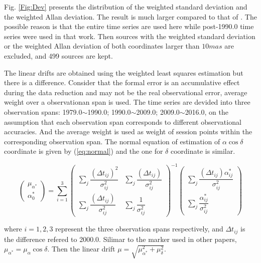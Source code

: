 \documentclass{aa}
\begin{document}
Fig. \ref{Fig:Dev} presents the distribution of the weighted standard deviation and the weighted Allan deviation. The result is much larger compared to that of \cite{F-V2003}. The possible reason is that the entire time series are used here while post-1990.0 time series were used in that work. Then sources with the weighted standard deviation or the weighted Allan deviation of both coordinates larger than $10mas$ are excluded, and 499 sources are kept.

The linear drifts are obtained using the weighted least squares estimation but there is a difference. Consider that the formal error is an accumulative effect during the data reduction and may not be the real observational error, average weight over a observationan span is used. The time series are devided into three observation spans: 1979.0$\sim$1990.0; 1990.0$\sim$2009.0; 2009.0$\sim$2016.0, on the assumption that each observation span corresponds to different observational accuracies. And the average weight is used as weight of session points within the corresponding observation span. The normal equation of estimation of $\alpha\cos\delta$ coordinate is  given by (\ref{eq:normal}) and the one for $\delta$ coordinate is similar. 

\begin{equation}
\label{eq:normal}
\left(
	\begin{array}{c}
	\mu _{\alpha ^{*}} \\
	\alpha ^{*}_0
	\end{array}
\right)
	= \sum _{i=1}^3
\left(
	\begin{array}{cc}
	\sum\limits _j \dfrac{(\Delta t_{ij} )^2}{\sigma ^2_{ij}} & \sum\limits_j \dfrac{(\Delta t_{ij})}{\sigma ^2_{ij}} \\
	\sum\limits_j \dfrac{(\Delta t_{ij})}{\sigma ^2_{ij}}   & \sum\limits_j \dfrac{1}{\sigma ^2_{ij}}
	\end{array}
\right) ^{-1}
\left(
	\begin{array}{c}
	\sum\limits_j \dfrac{(\Delta t_{ij})\alpha ^{*}_{ij}}{\sigma ^2_{ij}} \\
	\sum\limits_j \dfrac{\alpha ^{*}_{ij}}{\sigma _{ij} ^2}  
	\end{array}
\right)
\end{equation} 

where $i=1, 2, 3$ represent the three observation spans respectively, and $\Delta t_{ij}$ is the difference refered to 2000.0. Silimar to the marker used in other papers, $\mu _{\alpha ^*} = \mu _{\alpha}\cos\delta$. Then the  linear drift $\mu = \sqrt{ \mu_{\alpha ^*}^2 + \mu ^2_\delta}$. 
\end{document}
